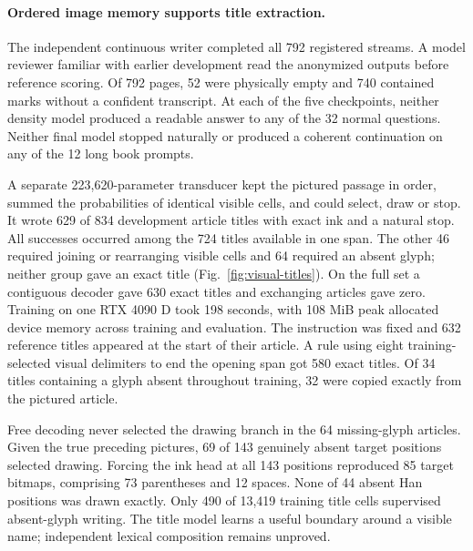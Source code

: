 \paragraph{Ordered image memory supports title extraction.}
The independent continuous writer completed all 792 registered streams.
A model reviewer familiar with earlier development read the anonymized
outputs before reference scoring. Of 792 pages, 52 were physically empty
and 740 contained marks without a confident transcript. At each of the five
checkpoints, neither density model produced a readable answer to any of
the 32 normal questions. Neither final model stopped naturally or produced
a coherent continuation on any of the 12 long book prompts.

A separate 223,620-parameter transducer kept the pictured passage in order,
summed the probabilities of identical visible cells, and could select,
draw or stop. It wrote 629 of 834 development article titles with exact
ink and a natural stop. All successes occurred among the 724 titles
available in one span. The other 46 required joining or rearranging
visible cells and 64 required an absent glyph; neither group gave an
exact title (Fig.~\ref{fig:visual-titles}). On the full set a contiguous
decoder gave 630 exact titles and exchanging articles gave zero.
Training on one RTX 4090 D took 198 seconds, with 108 MiB peak allocated
device memory across training and evaluation. The instruction was fixed
and 632 reference titles appeared at the start of their article. A rule
using eight training-selected visual delimiters to end the opening span
got 580 exact titles. Of 34 titles containing a glyph absent throughout
training, 32 were copied exactly from the pictured article.

Free decoding never selected the drawing branch in the 64 missing-glyph
articles. Given the true preceding pictures, 69 of 143 genuinely absent
target positions selected drawing. Forcing the ink head at all 143
positions reproduced 85 target bitmaps, comprising 73 parentheses and
12 spaces. None of 44 absent Han positions was drawn exactly. Only 490
of 13,419 training title cells supervised absent-glyph writing. The title
model learns a useful boundary around a visible name; independent lexical
composition remains unproved.
